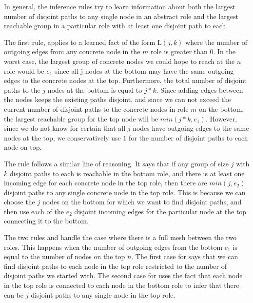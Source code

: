 \documentclass[numbers, 10pt, preprint]{sigplanconf}
\begin{document}
In general, the inference rules try to learn information about both the largest number of disjoint paths to any single node in an abstract role and the largest reachable group in a particular role with at least one disjoint path to each.

The first rule,  applies to a learned fact of the form L$(j,k)$ where the number of outgoing edges from any concrete node in the $m$ role is greater than 0. In the worst case, the largest group of concrete nodes we could hope to reach at the $n$ role would be $e_1$ since all j nodes at the bottom may have the same outgoing edges to the concrete nodes at the top. Furthermore, the total number of disjoint paths to the $j$ nodes at the bottom is equal to $j*k$. Since adding edges between the nodes keeps the existing paths disjoint, and since we can not exceed the current number of disjoint paths to the concrete nodes in role $m$ on the bottom, the largest reachable group for the top node will be $min(j*k,e_1)$. However, since we do not know for certain that all $j$ nodes have outgoing edges to the same nodes at the top, we conservatively use $1$ for the number of disjoint paths to each node on top.

The rule  follows a similar line of reasoning. It says that if any group of size $j$ with $k$ disjoint paths to each is reachable in the bottom role, and there is at least one incoming edge for each concrete node in the top role, then there are $min(j,e_2)$ disjoint paths to any single concrete node in the top role. This is because we can choose the $j$ nodes on the bottom for which we want to find disjoint paths, and then use each of the $e_2$ disjoint incoming edges for the particular node at the top connecting it to the bottom.

The two rules  and  handle the case where there is a full mesh between the two roles. This happens when the number of outgoing edges from the bottom $e_1$ is equal to the number of nodes on the top $n$. The first case for  says that we can find disjoint paths to each node in the top role restricted to the number of disjoint paths we started with. The second case for  uses the fact that each node in the top role is connected to each node in the bottom role to infer that there can be $j$ disjoint paths to any single node in the top role.
\end{document}
